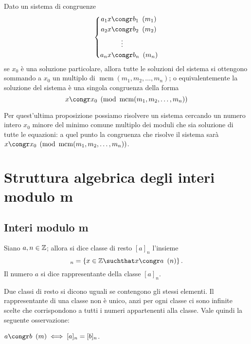 \begin{proposition}
    Dato un sistema di congruenze 
    \begin{equation*}
        \left\{
        \begin{alignedat}{1}
            a_1x &\congr b_1 \Mod{m_1}\\
            a_2x &\congr b_2 \Mod{m_2}\\
            &\vdotswithin{\congr} \\
            a_nx &\congr b_n \Mod{m_n}
        \end{alignedat}      
        \right . 
    \end{equation*}
    se $x_0$ è una soluzione particolare, allora tutte le soluzioni del sistema si ottengono sommando a $x_0$ un multiplo di $\operatorname{mcm}(m_1, m_2, \dots, m_n)$; o equivalentemente la soluzione del sistema è una singola congruenza della forma
    \begin{equation}
        x \congr x_0 \pmod{\operatorname{mcm}(m_1, m_2, \dots, m_n)}
    \end{equation}
\end{proposition}

Per quest'ultima proposizione possiamo risolvere un sistema cercando un numero intero $x_0$ minore del minimo comune multiplo dei moduli che sia soluzione di tutte le equazioni: a quel punto la congruenza che risolve il sistema sarà $x \congr x_0 \pmod{\operatorname{mcm}(m_1, m_2, \dots, m_n)}$.

\section{Struttura algebrica degli interi modulo m}

\subsection{Interi modulo m}

\begin{definition}
    Siano $a, n \in \mathbb{Z}$; allora si dice classe di resto $[a]_n$ l'insieme 
    \begin{equation}
        [a]_n = \left\{x \in \Z \suchthat x \congr a \Mod{n}\right\}.
    \end{equation}
    Il numero $a$ si dice rappresentante della classe $[a]_n$.
\end{definition}

Due classi di resto si dicono uguali se contengono gli stessi elementi.
Il rappresentante di una classe non è unico, anzi per ogni classe ci sono infinite scelte che corrispondono a tutti i numeri appartenenti alla classe. Vale quindi la seguente osservazione:
\begin{remark}
    $a \congr b \Mod{m} \iff [a]_n = [b]_n$.
\end{remark}

